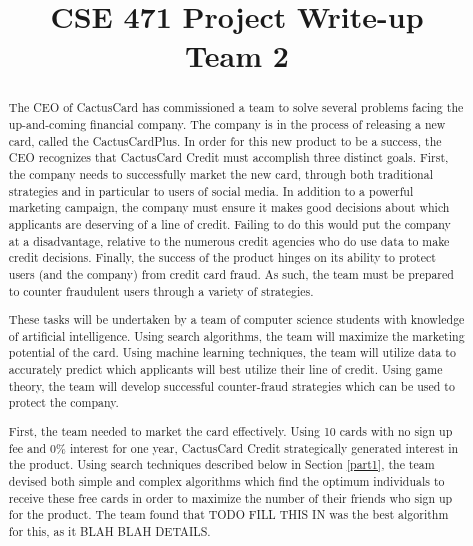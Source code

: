 \documentclass[11pt,journal]{IEEEtran}
\begin{document}
\title{CSE 471 Project Write-up \\ Team 2}

\author{
}

\maketitle

\renewcommand{\abstractname}{Executive Summary}
\begin{abstract}
The CEO of CactusCard has commissioned a team to solve several problems facing the up-and-coming financial company. The company is in the process of releasing a new card, called the CactusCardPlus. In order for this new product to be a success, the CEO recognizes that CactusCard Credit must accomplish three distinct goals. First, the company needs to successfully market the new card, through both traditional strategies and in particular to users of social media. In addition to a powerful marketing campaign, the company must ensure it makes good decisions about which applicants are deserving of a line of credit. Failing to do this would put the company at a disadvantage, relative to the numerous credit agencies who do use data to make credit decisions. Finally, the success of the product hinges on its ability to protect users (and the company) from credit card fraud. As such, the team must be prepared to counter fraudulent users through a variety of strategies.
\par
These tasks will be undertaken by a team of computer science students with knowledge of artificial intelligence. Using search algorithms, the team will maximize the marketing potential of the card. Using machine learning techniques, the team will utilize data to accurately predict which applicants will best utilize their line of credit. Using game theory, the team will develop successful counter-fraud strategies which can be used to protect the company. 
\par
First, the team needed to market the card effectively. Using 10 cards with no sign up fee and 0\% interest for one year, CactusCard Credit strategically generated interest in the product. Using search techniques described below in Section \ref{part1}, the team devised both simple and complex algorithms which find the optimum individuals to receive these free cards in order to maximize the number of their friends who sign up for the product. The team found that TODO FILL THIS IN was the best algorithm for this, as it BLAH BLAH DETAILS.

\end{abstract}
\end{document}
